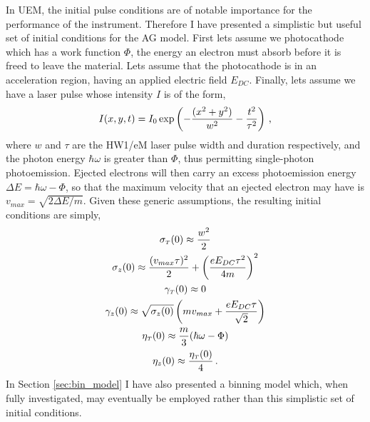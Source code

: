 In UEM, the initial pulse conditions are of notable importance for the performance of the instrument.
Therefore I have presented a simplistic but useful set of initial conditions for the AG model.
First lets assume we photocathode which has a work function $\Phi$, the energy an electron must absorb before it is freed to leave the material.
Lets assume that the photocathode is in an acceleration region, having an applied electric field $E_{DC}$.
Finally, lets assume we have a laser pulse whose intensity $I$ is of the form,
\begin{equation}
  I ( x , y , t ) = I_{0} \exp \left ( - \frac{ ( x^{2} +y^{2} ) }{ w^{2} } - \frac{ t^{ 2 } }{ \tau^{ 2 } } \right ) \, \text{,}
\end{equation}
where $w$ and $\tau$ are the HW1/eM laser pulse width and duration respectively, and the photon energy $\hbar \omega$ is greater than $\Phi$, thus permitting single-photon photoemission.
Ejected electrons will then carry an excess photoemission energy $\Delta E = \hbar \omega - \Phi$, so that the maximum velocity that an ejected electron may have is $ v_{max} = \sqrt{ 2 \Delta E / m } $.
Given these generic assumptions, the resulting initial conditions are simply,
\begin{subequations}
  \begin{gather}
    \sigma_{ {\scriptscriptstyle T} } ( 0 ) \approx \frac{ w^{ 2 } }{ 2 } \\
    \sigma_{ z } ( 0 ) \approx \frac{ ( v_{max} \tau )^{ 2 } }{ 2 } + \left ( \frac{ e E_{ DC } \tau^{ 2 } }{ 4 m } \right )^{ 2 } \\
    \gamma_{ {\scriptscriptstyle T} } ( 0 ) \approx 0 \\
    \gamma_{ z } ( 0 ) \approx \sqrt{ \sigma_{ z } ( 0 ) } \left ( m v_{max} + \frac{ e E_{DC} \tau }{ \sqrt{ 2 } } \right ) \\
    \eta_{ {\scriptscriptstyle T} } ( 0 ) \approx \frac{ m }{ 3 } ( \hbar \omega - \Phi ) \\
    \eta_{ z } ( 0 ) \approx \frac{ \eta_{ {\scriptscriptstyle T} } ( 0 ) }{ 4 } \, \text{.}
  \end{gather}
\end{subequations}
In Section \ref{sec:bin_model} I have also presented a binning model which, when fully investigated, may eventually be employed rather than this simplistic set of initial conditions.

